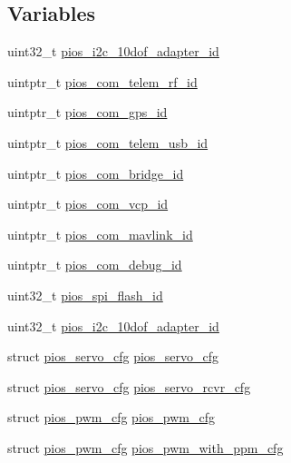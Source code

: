 \subsection*{\-Variables}
\begin{DoxyCompactItemize}
\item 
uint32\-\_\-t \hyperlink{group___flying_f4_ga697e424a8ada2da6558bd1576496df09}{pios\-\_\-i2c\-\_\-10dof\-\_\-adapter\-\_\-id}
\item 
uintptr\-\_\-t \hyperlink{group___flying_f4_gae48e848f715b08971e23528feee79339}{pios\-\_\-com\-\_\-telem\-\_\-rf\-\_\-id}
\item 
uintptr\-\_\-t \hyperlink{group___flying_f4_ga05dca72c42c6c2b33fa62b8ee0fcb2ea}{pios\-\_\-com\-\_\-gps\-\_\-id}
\item 
uintptr\-\_\-t \hyperlink{group___flying_f4_ga513cc36d72b76de2fcb75ff233a79a4a}{pios\-\_\-com\-\_\-telem\-\_\-usb\-\_\-id}
\item 
uintptr\-\_\-t \hyperlink{group___flying_f4_gac040f05fa048688ee0269c2768698a14}{pios\-\_\-com\-\_\-bridge\-\_\-id}
\item 
uintptr\-\_\-t \hyperlink{group___flying_f4_gaaeb3e0d65ed5c6e7b921c54e1ad905db}{pios\-\_\-com\-\_\-vcp\-\_\-id}
\item 
uintptr\-\_\-t \hyperlink{group___flying_f4_gabdefeb92517c08b2db19b764db941de9}{pios\-\_\-com\-\_\-mavlink\-\_\-id}
\item 
uintptr\-\_\-t \hyperlink{group___flying_f4_ga14dc9e3d330b80a37a9699c2112358e0}{pios\-\_\-com\-\_\-debug\-\_\-id}
\item 
uint32\-\_\-t \hyperlink{group___flying_f4_gaebc54f2c5fc298fad979df4d9bd1414b}{pios\-\_\-spi\-\_\-flash\-\_\-id}
\item 
uint32\-\_\-t \hyperlink{group___flying_f4_ga697e424a8ada2da6558bd1576496df09}{pios\-\_\-i2c\-\_\-10dof\-\_\-adapter\-\_\-id}
\item 
struct \hyperlink{structpios__servo__cfg}{pios\-\_\-servo\-\_\-cfg} \hyperlink{group___flying_f4_ga57a87ef16d7949a9cc3589efc8d88a28}{pios\-\_\-servo\-\_\-cfg}
\item 
struct \hyperlink{structpios__servo__cfg}{pios\-\_\-servo\-\_\-cfg} \hyperlink{group___flying_f4_gaa111328ef9a12c806ed1c24b93d4f663}{pios\-\_\-servo\-\_\-rcvr\-\_\-cfg}
\item 
struct \hyperlink{structpios__pwm__cfg}{pios\-\_\-pwm\-\_\-cfg} \hyperlink{group___flying_f4_ga7587f8e174df90bef8cec1edfa9e14c1}{pios\-\_\-pwm\-\_\-cfg}
\item 
struct \hyperlink{structpios__pwm__cfg}{pios\-\_\-pwm\-\_\-cfg} \hyperlink{group___flying_f4_ga6a7a8338c617f18384f3b3c5678f5505}{pios\-\_\-pwm\-\_\-with\-\_\-ppm\-\_\-cfg}

\end{DoxyCompactItemize}
